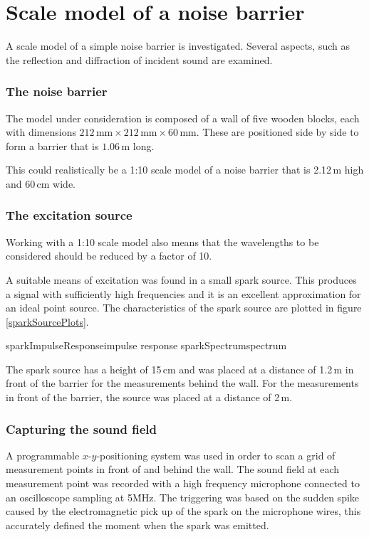\section{Scale model of a noise barrier \label{sectScalemodel}}
A scale model of a simple noise barrier is investigated. Several aspects, such as the reflection and diffraction of incident sound are examined.

\subsubsection*{The noise barrier}
The model under consideration is composed of a wall of five wooden blocks, each with dimensions $212\,\mathrm{mm} \times 212\,\mathrm{mm} \times 60\,\mathrm{mm}$. These are positioned side by side to form a barrier that is $1.06\,\mathrm{m}$ long.

This could realistically be a 1:10 scale model of a noise barrier that is 2.12\,m high and 60\,cm wide. 

\subsubsection*{The excitation source}
Working with a 1:10 scale model also means that the wavelengths to be considered should be reduced by a factor of 10.

A suitable means of excitation was found in a small spark source. This produces a signal with sufficiently high frequencies and it is an excellent approximation for an ideal point source. The characteristics of the spark source are plotted in figure \ref{sparkSourcePlots}.

	{sparkImpulseResponse}{impulse response}
	{sparkSpectrum}{spectrum}

The spark source has a height of 15\,cm and was placed at a distance of 1.2\,m in front of the barrier for the measurements behind the wall. For the measurements in front of the barrier, the source was placed at a distance of 2\,m.



\subsubsection*{Capturing the sound field}
A programmable $x$-$y$-positioning system was used in order to scan a grid of measurement points in front of and behind the wall. The sound field at each measurement point was recorded with a high frequency microphone connected to an oscilloscope sampling at 5\.MHz. The triggering was based on the sudden spike caused by the electromagnetic pick up of the spark on the microphone wires, this accurately defined the moment when the spark was emitted.

